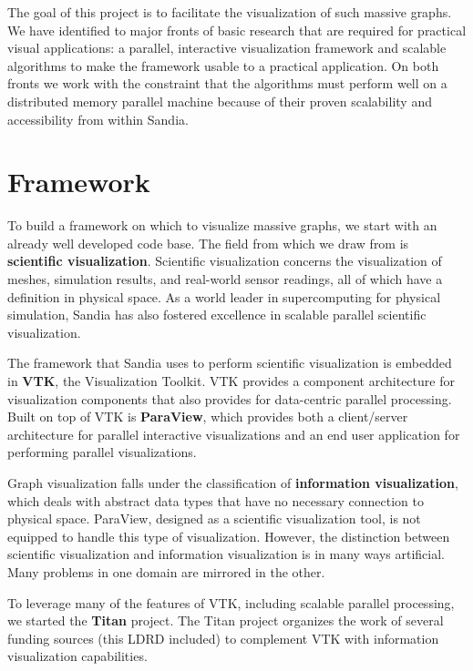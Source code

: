 \documentclass[pdf,12pt,report,strict]{SANDreport}
\newcommand{\titan}{Titan\index{Titan}\xspace}
\newcommand*{\keyterm}[1]{\textbf{#1}}
\newcommand*{\keytermidx}[1]{\keyterm{#1}\index{#1}}
\begin{document}
The goal of this project is to facilitate the visualization of such massive
graphs.  We have identified to major fronts of basic research that are
required for practical visual applications: a parallel, interactive
visualization framework and scalable algorithms to make the framework
usable to a practical application.  On both fronts we work with the
constraint that the algorithms must perform well on a distributed memory
parallel machine because of their proven scalability and accessibility
from within Sandia.

\section{Framework}

To build a framework on which to visualize massive graphs, we start with an
already well developed code base.  The field from which we draw from is
\keyterm{scientific visualization}.  Scientific
visualization concerns the visualization of meshes, simulation results, and
real-world sensor readings, all of which have a definition in physical
space.  As a world leader in supercomputing for physical simulation, Sandia
has also fostered excellence in scalable parallel scientific visualization.


The framework that Sandia uses to perform scientific visualization is
embedded in \keytermidx{VTK}, the Visualization Toolkit.  VTK provides a
component architecture for visualization components that also provides for
data-centric parallel processing.  Built on top of VTK is
\keytermidx{ParaView}, which provides both a client/server architecture for
parallel interactive visualizations and an end user application for
performing parallel visualizations.

Graph visualization falls under the classification of \keyterm{information
visualization}, which deals with abstract
data types that have no necessary connection to physical space.  ParaView,
designed as a scientific visualization tool, is not equipped to handle this
type of visualization.  However, the distinction between scientific
visualization and information visualization is in many ways artificial.
Many problems in one domain are mirrored in the other.

To leverage many of the features of VTK, including scalable parallel
processing, we started the \keyterm{\titan} project.
The \titan project organizes the work of several funding sources (this LDRD
included) to complement VTK with information visualization capabilities.
\end{document}
